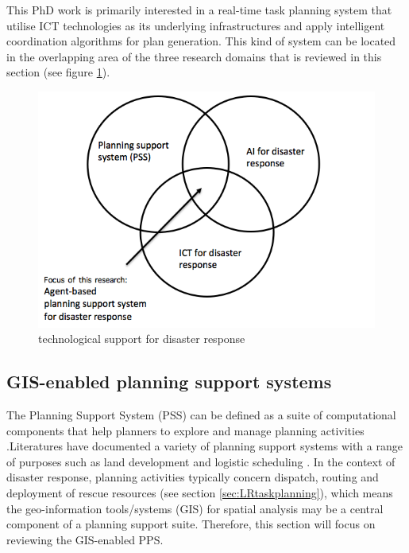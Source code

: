 This PhD work is primarily interested in a real-time task planning system that utilise ICT technologies as its underlying infrastructures and apply intelligent coordination algorithms for plan generation. This kind of system can be located in the overlapping area of the three research domains that is reviewed in this section (see figure \ref{fig:SystemFraming}).\\

\begin{figure}[h]
  \centering
  \includegraphics[width=1\textwidth]{img/background/SystemFraming}
  \caption{technological support for disaster response}
  \label{fig:SystemFraming}
\end{figure} 

\subsection{GIS-enabled planning support systems}
The Planning Support System (PSS) can be defined as a suite of computational components that help planners to explore and manage planning activities \cite{Geertman2004}.Literatures have documented a variety of planning support systems with a range of purposes such as land development \cite{Pettit2003}  and logistic scheduling \cite{Miller}. In the context of disaster response, planning activities  typically concern dispatch, routing and deployment of rescue resources (see section \ref{sec:LRtaskplanning}), which means the geo-information tools/systems (GIS) for spatial analysis may be a central component of a planning support suite. Therefore, this section will focus on reviewing the GIS-enabled PPS. \\

